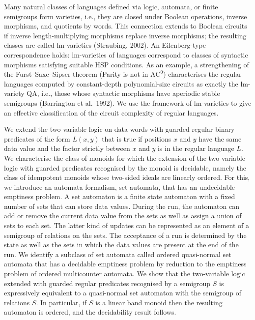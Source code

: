 \documentclass[a4paper,UKenglish]{dagrep-v2021}
\begin{document}
Many natural classes of languages defined via logic, automata, or finite semigroups form varieties, i.e., they are closed under Boolean operations, inverse morphisms, and quotients by words. This connection extends to Boolean circuits if inverse length-multiplying morphisms replace inverse morphisms; the resulting classes are called lm-varieties (Straubing, 2002). An Eilenberg-type correspondence holds: lm-varieties of languages correspond to classes of syntactic morphisms satisfying suitable HSP conditions. As an example, a strengthening of the Furst--Saxe--Sipser theorem (Parity is not in $\mathrm{AC}^0$) characterises the regular languages computed by constant-depth polynomial-size circuits as exactly the lm-variety QA, i.e., those whose syntactic morphisms have aperiodic stable semigroups (Barrington et al.\ 1992). We use the framework of lm-varieties to give an effective classification of the circuit complexity of regular languages.


We extend the two-variable logic on data words with guarded regular binary predicates of the form $L(x, y)$ that is true if positions $x$ and $y$ have the same data value and the factor strictly between $x$ and $y$ is in the regular language $L$. We characterise the class of monoids for which the extension of the two-variable logic with guarded predicates recognised by the monoid is decidable, namely the class of idempotent monoids whose two-sided ideals are linearly ordered. For this, we introduce an automata formalism, set automata, that has an undecidable emptiness problem. A set automaton is a finite state automaton with a fixed number of sets that can store data values. During the run, the automaton can add or remove the current data value from the sets as well as assign a union of sets to each set. The latter kind of updates can be represented as an element of a semigroup of relations on the sets. The acceptance of a run is determined by the state as well as the sets in which the data values are present at the end of the run. We identify a subclass of set automata called ordered quasi-normal set automata that has a decidable emptiness problem by reduction to the emptiness problem of ordered multicounter automata. We show that the two-variable logic extended with guarded regular predicates recognised by a semigroup $S$ is expressively equivalent to a quasi-normal set automaton with the semigroup of relations $S$. In particular, if $S$ is a linear band monoid then the resulting automaton is ordered, and the decidability result follows.
\end{document}
